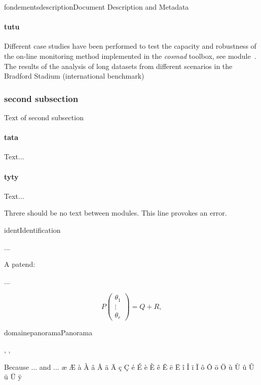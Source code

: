 \documentclass{ra2011}
\begin{document}
\begin{module}{fondements}{description}{Document Description and Metadata}
\paragraph{tutu}
Different case studies have been performed to test the capacity and robustness 
of the on-line monitoring method implemented in the \emph{cosmad} toolbox, 
see module~\protect{}.
The results of the analysis 
of long datasets from different scenarios in the Bradford Stadium (international benchmark)

\subsubsection{second subsection}
Text of second subsection
\paragraph{tata}
Text...

\paragraph{tyty}
Text...
\end{module}

Threre should be no text between modules. This line provokes an error.
\begin{module}{}{ident}{Identification}

...

A patend: \cite{Algo09} 

...

\begin{equation}
  P \left(\begin{array} {c}
     \theta_{1} \\ \vdots  \\ \theta_{r} 
\end{array}
  \right) = Q + R, \label{noisident}
\end{equation}

\end{module}


\begin{module}{domaine}{panorama}{Panorama}
\begin{participants}
  ,
  ,
\end{participants}


Because ... and ... æ Æ à À â Â ä Ä ç Ç é É è È ê Ê ë Ë î Î ï Ï ô Ô ö Ö ù Ù û Û ü Ü ÿ

\end{module}
\end{document}
